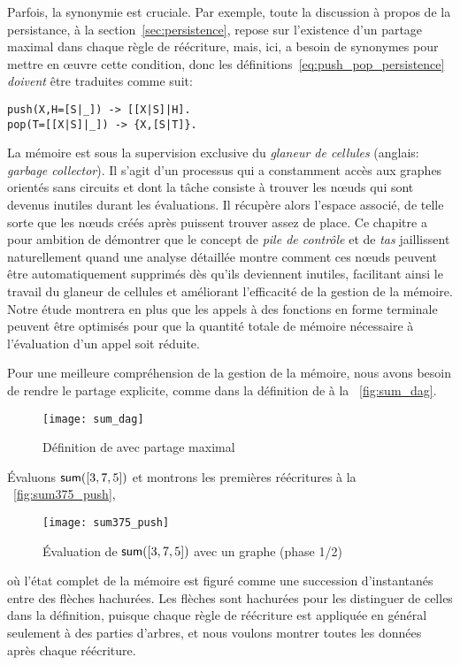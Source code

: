 Parfois, la synonymie est cruciale. Par exemple, toute la discussion à
propos de la persistance, à la section~\ref{sec:persistence}, repose
sur l'existence d'un partage maximal dans chaque règle de réécriture,
mais, ici, \Erlang a besoin de synonymes pour mettre en œuvre
cette condition, donc les définitions~\eqref{eq:push_pop_persistence}
 \emph{doivent} être traduites comme
suit:
\begin{verbatim}
push(X,H=[S|_]) -> [[X|S]|H].
pop(T=[[X|S]|_]) -> {X,[S|T]}.
\end{verbatim}


La mémoire est sous la supervision exclusive du
\emph{glaneur de cellules} (anglais: \emph{garbage collector}). Il
s'agit d'un processus qui a constamment accès aux graphes orientés
sans circuits et dont la tâche consiste à trouver les nœuds qui
sont devenus inutiles durant les évaluations. Il récupère alors
l'espace associé, de telle sorte que les nœuds créés après
puissent trouver assez de place. Ce chapitre a pour ambition de
démontrer que le concept de \emph{pile de contrôle} et de \emph{tas}
jaillissent naturellement quand une analyse détaillée montre comment
ces nœuds peuvent être automatiquement supprimés dès qu'ils
deviennent inutiles, facilitant ainsi le travail du glaneur de
cellules et améliorant l'efficacité de la gestion de la mémoire. Notre
étude montrera en plus que les appels à des fonctions en forme
terminale peuvent être optimisés pour que la quantité totale de mémoire nécessaire à
l'évaluation d'un appel soit réduite.

Pour une meilleure compréhension de la gestion de la mémoire, nous
avons besoin de rendre le partage explicite, comme dans la définition
de  à la \fig~\vref{fig:sum_dag}.
\begin{figure}
\centering
\texttt{[image: sum\_dag]}%
\caption{Définition de  avec partage maximal}
\label{fig:sum_dag}
\end{figure}
Évaluons \(\textsf{sum}([3,7,5])\) et montrons les premières réécritures
à la \fig~\vref{fig:sum375_push},
\begin{figure}[b]
\centering
\texttt{[image: sum375\_push]}
\caption{Évaluation de \(\textsf{sum}([3,7,5])\) avec un graphe (phase 1/2)}
\label{fig:sum375_push}
\end{figure}
où l'état complet de la mémoire est figuré comme une succession
d'instantanés entre des flèches hachurées.  Les flèches sont hachurées pour les distinguer de celles
dans la définition, puisque chaque règle de réécriture est appliquée
en général seulement à des parties d'arbres, et nous voulons montrer
toutes les données après chaque réécriture.

